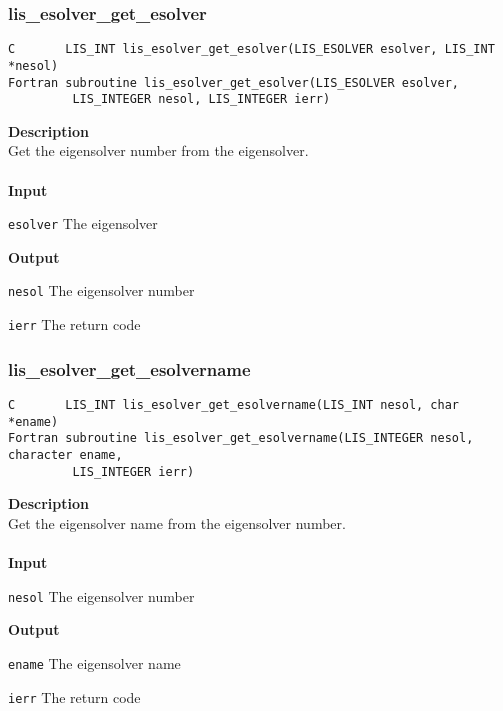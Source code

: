 \documentclass[a4paper]{article}
\newcommand{\namelistlabel}[1]{\mbox{#1}\hfill}
\newenvironment{namelist}[1]{%
\begin{list}{}
  {\let\makelabel\namelistlabel
  \settowidth{\labelwidth}{#1}
  \setlength{\leftmargin}{1.1\labelwidth}}
  }{%
\end{list}}
\begin{document}
\subsubsection{lis\_esolver\_get\_esolver}
\begin{screen}
\verb|C       LIS_INT lis_esolver_get_esolver(LIS_ESOLVER esolver, LIS_INT *nesol)|\\
\verb|Fortran subroutine lis_esolver_get_esolver(LIS_ESOLVER esolver,|\\
\verb|         LIS_INTEGER nesol, LIS_INTEGER ierr)|
\end{screen}
{\bf Description}\\
\indent
Get the eigensolver number from the eigensolver.
\\ \\
\noindent
{\bf Input}
\begin{namelist}{XXXXXXXXXXXXXXXXXXXX}
\item[\tt esolver] The eigensolver
\end{namelist}
{\bf Output}
\begin{namelist}{XXXXXXXXXXXXXXXXXXXX}
\item[\tt nesol] The eigensolver number
\item[\tt ierr] The return code
\end{namelist}

\subsubsection{lis\_esolver\_get\_esolvername}
\begin{screen}
\verb|C       LIS_INT lis_esolver_get_esolvername(LIS_INT nesol, char *ename)|\\
\verb|Fortran subroutine lis_esolver_get_esolvername(LIS_INTEGER nesol, character ename,|\\
\verb|         LIS_INTEGER ierr)|
\end{screen}
{\bf Description}\\
\indent
Get the eigensolver name from the eigensolver number.
\\ \\
\noindent
{\bf Input}
\begin{namelist}{XXXXXXXXXXXXXXXXXXXX}
\item[\tt nesol] The eigensolver number
\end{namelist}
{\bf Output}
\begin{namelist}{XXXXXXXXXXXXXXXXXXXX}
\item[\tt ename] The eigensolver name
\item[\tt ierr] The return code
\end{namelist}
\end{document}
